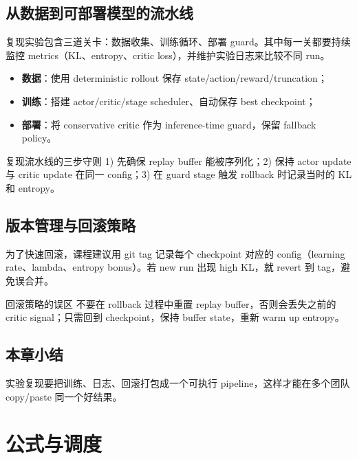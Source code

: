 \documentclass[a4paper]{article}
\begin{document}
\subsection{从数据到可部署模型的流水线}

复现实验包含三道关卡：数据收集、训练循环、部署 guard。其中每一关都要持续监控 metrics（KL、entropy、critic loss），并维护实验日志来比较不同 run。

\begin{itemize}
    \item \textbf{数据}：使用 deterministic rollout 保存 state/action/reward/truncation；
    \item \textbf{训练}：搭建 actor/critic/stage scheduler、自动保存 best checkpoint；
    \item \textbf{部署}：将 conservative critic 作为 inference-time guard，保留 fallback policy。
\end{itemize}

\begin{importantbox}{复现流水线的三步守则}
1) 先确保 replay buffer 能被序列化；2) 保持 actor update 与 critic update 在同一 config；3) 在 guard stage 触发 rollback 时记录当时的 KL 和 entropy。
\end{importantbox}

\subsection{版本管理与回滚策略}

为了快速回滚，课程建议用 git tag 记录每个 checkpoint 对应的 config（learning rate、lambda、entropy bonus）。若 new run 出现 high KL，就 revert 到 tag，避免误合并。

\begin{warningbox}{回滚策略的误区}
不要在 rollback 过程中重置 replay buffer，否则会丢失之前的 critic signal；只需回到 checkpoint，保持 buffer state，重新 warm up entropy。
\end{warningbox}

\subsection{本章小结}

实验复现要把训练、日志、回滚打包成一个可执行 pipeline，这样才能在多个团队 copy/paste 同一个好结果。

\section{公式与调度}
\end{document}
